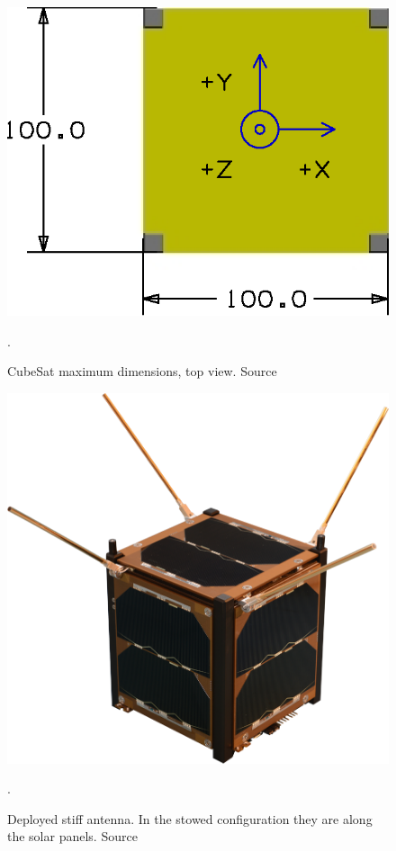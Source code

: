 \begin{figure}[H]
    \centering
    \includegraphics[width=0.45\paperwidth]{img/4/cubesat_dimensions.eps}
    \caption{CubeSat maximum dimensions, top view. Source \cite{cubesat_spec}}.
    \label{CubeSat_max_dim}
\end{figure}

\begin{figure}[H]
    \centering
    \includegraphics[width=0.5\paperwidth]{img/4/antenna_stiff.png}
    \caption{Deployed stiff antenna. In the stowed configuration they are along the solar panels. Source \cite{stiff_antenna_paper}}.
    \label{stiff_antenna_pic}
\end{figure}

